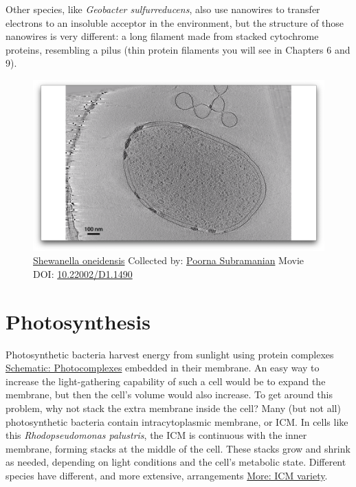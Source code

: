 \documentclass[]{tufte-book}
\begin{document}
Other species, like \emph{Geobacter sulfurreducens}, also use nanowires
to transfer electrons to an insoluble acceptor in the environment, but
the structure of those nanowires is very different: a long filament made
from stacked cytochrome proteins, resembling a pilus (thin protein
filaments you will see in Chapters 6 and 9).





\begin{figure}
\includegraphics{movie_stills/4_2} \caption[\protect\hyperlink{tree}{Shewanella oneidensis} Collected by:
\protect\hyperlink{poorna_subramanian}{Poorna Subramanian} Movie DOI:
\href{https://doi.org/10.22002/D1.1490}{10.22002/D1.1490}]{\protect\hyperlink{tree}{Shewanella oneidensis} Collected by:
\protect\hyperlink{poorna_subramanian}{Poorna Subramanian} Movie DOI:
\href{https://doi.org/10.22002/D1.1490}{10.22002/D1.1490}}\label{fig:4-2}
\end{figure}

\section{Photosynthesis}\label{photosynthesis}

Photosynthetic bacteria harvest energy from sunlight using protein
complexes \protect\hyperlink{Photocomplexes}{Schematic: Photocomplexes}
embedded in their membrane. An easy way to increase the light-gathering
capability of such a cell would be to expand the membrane, but then the
cell's volume would also increase. To get around this problem, why not
stack the extra membrane inside the cell? Many (but not all)
photosynthetic bacteria contain intracytoplasmic membrane, or ICM. In
cells like this \emph{Rhodopseudomonas palustris}, the ICM is continuous
with the inner membrane, forming stacks at the middle of the cell. These
stacks grow and shrink as needed, depending on light conditions and the
cell's metabolic state. Different species have different, and more
extensive, arrangements \protect\hyperlink{ICM_variety}{More: ICM
variety}.
\end{document}
